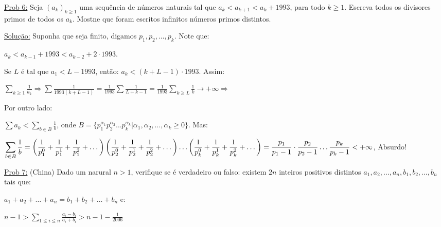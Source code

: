\documentclass[a4paper,12pt]{article}
\renewcommand{\leq}{\ensuremath{\leqslant}}
\renewcommand{\geq}{\ensuremath{\geqslant}}
\newcommand*{\hm}[1]{#1\nobreak\discretionary{}
	{\hbox{$\mathsurround=0pt #1$}}{}}
\theoremstyle{plain} %
\theoremstyle{definition} %
\theoremstyle{remark} %
\begin{document}
	\vspace{2ex}\underline{Prob 6:} Seja $(a_k)_{k\geq 1}$ uma sequ\^encia de n\'umeros naturais tal que $a_k<a_{k+1}<a_k+1993$, para todo $k\geq 1$. Escreva todos os divisores primos de todos os $a_k$. Mostne que foram escritos infinitos n\'umeros primos distintos.
	
	\begin{framed}
		\underline{Solu\c{c}\~ao:} Suponha que seja finito, digamos $p_1, p_2, \dotso, p_k$. Note que:
		
		\begin{center}
			$a_k<a_{k-1}+1993<a_{k-2}+2\cdot 1993$.
		\end{center}
		
		Se $L$ \'e tal que $a_1<L-1993$, ent\~ao: $a_k<(k+L-1)\cdot 1993$. Assim:
		
		$\sum\limits_{k\geq 1} \displaystyle\frac{1}{a_k}\Rightarrow\sum \frac{1}{1993(k+L-1)}=\frac{1}{1993}\sum \frac{1}{L+k-1}=\frac{1}{1993}\sum\limits_{k\geq L}\frac{1}{k}\rightarrow+\infty\Rightarrow$ 
		
		Por outro lado:
		
		$\displaystyle\sum a_k<\sum\limits_{b\in B} \frac{1}{b}$, onde $B=\{p_1^{\alpha_1} p_2^{\alpha_2} \dotso p_k^{\alpha_k}|\alpha_1, \alpha_2, \dotso, \alpha_k\geq 0\}$. Mas:
		
		$\displaystyle\sum\limits_{b\in B} \frac{1}{b}= \left(\frac{1}{p_1^0}+\frac{1}{p_1^1}+\frac{1}{p_1^2}+ \dots\right) \left(\frac{1}{p_2^0}+\frac{1}{p_2^1}+\frac{1}{p_2^2}+ \dots\right) \dots \left(\frac{1}{p_k^0}+\frac{1}{p_k^1}+\frac{1}{p_k^2}+ \dots\right)\hm{=} \frac{p_1}{p_1-1}\hm{\cdot}\frac{p_2}{p_2-1} \dots \frac{p_k}{p_k-1}<+\infty$, Absurdo! \tiny\textblock 
		
		\normalsize
	\end{framed}
	
	\vspace{2ex}\underline{Prob 7:} (China) Dado um narural $n>1$, verifique se \'e verdadeiro ou falso: existem $2n$ inteiros positivos distintos $a_1, a_2, \dotso, a_n, b_1, b_2, \dotso, b_n$ tais que: 
	
	$a_1+a_2+\dotso+a_n=b_1+b_2+\dotso+b_n$ e:
	
	\begin{center}
		$n-1>\displaystyle\sum\limits_{1\leq i\leq n} \frac{a_i-b_i}{a_i+b_i}>n-1-\frac{1}{2006}$ 
	\end{center}
	
\end{document}
